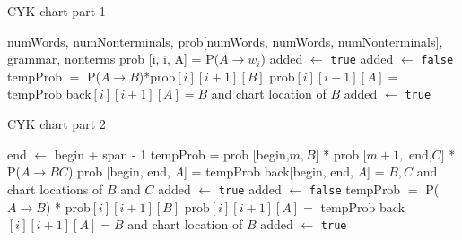\documentclass[11pt,twocolumn]{article}
\begin{document}





\begin{algorithm*}[!htb]
\caption{CYK chart part 1}
\label{cyk1}
\begin{algorithmic}[1]
\Require numWords, numNonterminals, prob[numWords, numWords, numNonterminals], grammar, nonterms
             \State prob [i, i, A] = P($A \rightarrow w_i$)
             \EndIf
		\State added $\gets$ \texttt{true}
			\State added $\gets$ \texttt{false}
					\State tempProb $=$ P($A \rightarrow B$)*prob$[i][i+1][B]$
						\State prob$[i][i+1][A] =$ tempProb
						\State back$[i][i+1] [A] = B$ and chart location of $B$
						\State added $\gets$ \texttt{true}
					\EndIf
				\EndIf
			\EndFor
		\EndWhile
\EndFor
\EndFor
\EndProcedure
{}
\end{algorithmic}
\end{algorithm*}

\begin{algorithm*}[!htb]
\caption{CYK chart part 2}
\label{cyk2}
\begin{algorithmic}[1]
             \State end $\gets$ begin + span - 1
                            \State tempProb = prob [begin,$ m, B]$ * prob $[m + 1,$ end,$ C]$ * P($A \rightarrow BC$) 
                              \State  prob [begin, end, $A$] = tempProb
                              \State  back[begin, end, $A$] = $B, C$ and chart locations of $B$ and $C$
                              \EndIf
				 \State added $\gets$ \texttt{true}
			\State added $\gets$ \texttt{false}
					\State tempProb $=$ P($A \rightarrow B$) * prob$[i][i+1][B]$
						\State prob$[i][i+1][A] =$ tempProb
						\State back$[i][i+1] [A] = B$ and chart location of $B$
						\State added $\gets$ \texttt{true}
					\EndIf
				\EndIf
			\EndFor
		\EndWhile
\EndFor
\EndFor
\EndFor
\EndFor
\EndFor
\EndFor
\EndProcedure
\end{algorithmic}
\end{algorithm*}
\end{document}
